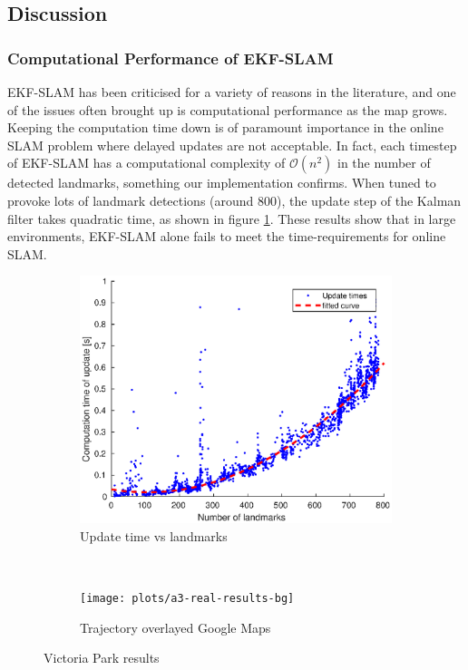 \subsection{Discussion}
\subsubsection{Computational Performance of EKF-SLAM}
EKF-SLAM has been criticised for a variety of reasons in the literature, and one of the issues often brought up is computational performance as the map grows. Keeping the computation time down is of paramount importance in the online SLAM problem where delayed updates are not acceptable. In fact, each timestep of EKF-SLAM has a computational complexity of $\mathcal{O}(n^2)$ in the number of detected landmarks\cite{divideandconq}, something our implementation confirms. When tuned to provoke lots of landmark detections (around 800), the update step of the Kalman filter takes quadratic time, as shown in figure \ref{fig:update_time_landmarks}. These results show that in large environments, EKF-SLAM alone fails to meet the time-requirements for online SLAM.
\begin{figure}
    \centering
    \begin{subfigure}{0.45\textwidth}
        \includegraphics[width=\textwidth]{plots/a3/update-time-vs-landmarks}
        \caption{Update time vs landmarks}
        \label{fig:update_time_landmarks}
    \end{subfigure}%
~
    \begin{subfigure}{0.45\textwidth}
        \texttt{[image: plots/a3-real-results-bg]}
        \caption{Trajectory overlayed Google Maps}
        \label{fig:results_bg}
    \end{subfigure}
    \caption{Victoria Park results}
\end{figure}

